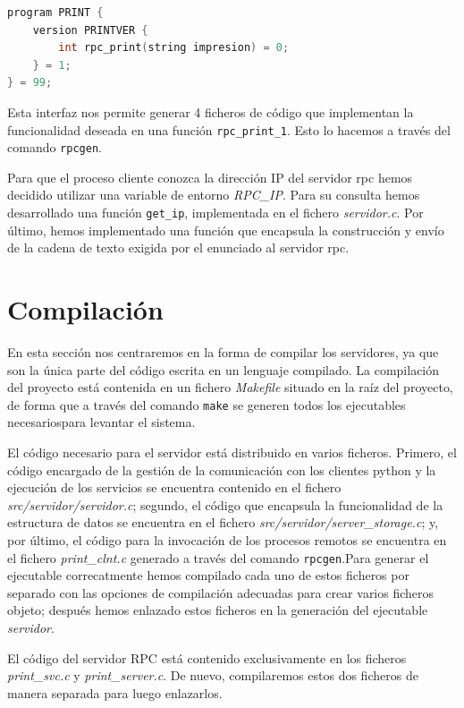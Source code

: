 \documentclass[]{article}
\begin{document}
\begin{lstlisting}[language=C, caption=Interfaz XDR]
program PRINT {
    version PRINTVER {
        int rpc_print(string impresion) = 0;
    } = 1;
} = 99;
\end{lstlisting}

Esta interfaz nos permite generar 4 ficheros de código que implementan la funcionalidad deseada en una función \texttt{rpc\_print\_1}. Esto lo hacemos a través del comando \texttt{rpcgen}.

Para que el proceso cliente conozca la dirección IP del servidor rpc hemos decidido utilizar una variable de entorno \textit{RPC\_IP}. Para su consulta hemos desarrollado una función \texttt{get\_ip}, implementada en el fichero \textit{servidor.c}. Por último, hemos implementado una función que encapsula la construcción y envío de la cadena de texto exigida por el enunciado al servidor rpc. 

\section{Compilación}
\label{sec:compilacion}
En esta sección nos centraremos en la forma de compilar los servidores, ya que son la única parte del código escrita en un lenguaje compilado. La compilación del proyecto está contenida en un fichero \textit{Makefile} situado en la raíz del proyecto, de forma que a través del comando \texttt{make} se generen todos los ejecutables necesariospara levantar el sistema.  

El código necesario para el servidor está distribuido en varios ficheros. Primero, el código encargado de la gestión de la comunicación con los clientes python y la ejecución de los servicios se encuentra contenido en el fichero \textit{src/servidor/servidor.c}; segundo, el código que encapsula la funcionalidad de la estructura de datos se encuentra en el fichero \textit{src/servidor/server\_storage.c}; y, por último, el código para la invocación de los procesos remotos se encuentra en el fichero \textit{print\_clnt.c} generado a través del comando \texttt{rpcgen}.Para generar el ejecutable correcatmente hemos compilado cada uno de estos ficheros por separado con las opciones de compilación adecuadas para crear varios ficheros objeto; después hemos enlazado estos ficheros en la generación del ejecutable \textit{servidor}.

El código del servidor RPC está contenido exclusivamente en los ficheros \textit{print\_svc.c} y \textit{print\_server.c}. De nuevo, compilaremos estos dos ficheros de manera separada para luego enlazarlos.
\end{document}
